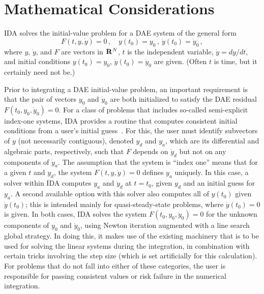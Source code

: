 \chapter{Mathematical Considerations}\label{s:math}

IDA solves the initial-value problem for 
a DAE system of the general form
\begin{equation}\label{e:DAE}
  F(t,y,{\dot y}) = 0 \, ,
  \quad y(t_0) = y_0 \, ,~ {\dot y}(t_0) = {\dot y}_0 \, ,
\end{equation}
where $y$, ${\dot y}$, and $F$ are vectors in ${\bf R}^N$, $t$ is the independent
variable, ${\dot y} = dy/dt$, 
and initial conditions $y(t_0) = y_0$, ${\dot y}(t_0) = {\dot y}_0$ 
are given.  (Often $t$ is time, but it certainly need not be.)

Prior to integrating a DAE initial-value problem, an important requirement 
is that the pair of vectors $y_0$ and ${\dot y_0}$ are both initialized to
satisfy the DAE residual $F(t_0,y_0, {\dot y}_0) = 0$.
For a class of problems that includes so-called
semi-explicit index-one systems, IDA provides a routine that computes
consistent initial conditions from a user's initial guess~\cite{BHP:98}.  
For this, the user must identify subvectors of $y$
(not necessarily contiguous), denoted $y_d$ and $y_a$, which are its
differential and algebraic parts, respectively, such that $F$ depends
on ${\dot y}_d$ but not on any components of ${\dot y}_a$.  The assumption that
the system is ``index one'' means that for a given $t$ and $y_d$, the
system $F(t,y,{\dot y}) = 0$ defines $y_a$ uniquely.  In this case, a solver
within IDA computes $y_a$ and ${\dot y}_d$ at $t = t_0$, given $y_d$ and an
initial guess for $y_a$.  A second available option with this solver
also computes all of $y(t_0)$ given ${\dot y}(t_0)$; this is intended mainly
for quasi-steady-state problems, where ${\dot y}(t_0) = 0$ is given.
In both cases, IDA solves the system $F(t_0,y_0, {\dot y}_0) = 0$ for the
unknown components of $y_0$ and ${\dot y}_0$, using Newton iteration
augmented with a line search global strategy.  In doing this, it makes
use of the existing machinery that is to be used for solving the
linear systems during the integration, in combination with certain
tricks involving the step size (which is set artificially for this
calculation).
For problems that do not fall into either of these categories, the
user is responsible for passing consistent values or risk failure in
the numerical integration.

